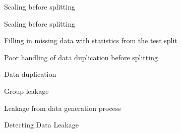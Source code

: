 \begin{frame}{Scaling before splitting}
  \begin{tdcodet}{Scaling before splitting}
  \end{tdcodet}
\end{frame}

\begin{frame}{Filling in missing data with statistics from the test split}
  \begin{withmargin}
    \begin{tdmain}
    \end{tdmain}
    \begin{tdmargin}
    \end{tdmargin}
  \end{withmargin}
\end{frame}

\begin{frame}{Poor handling of data duplication before splitting}
  \begin{tddef}{Data duplication}
  \end{tddef}
\end{frame}

\begin{frame}{Group leakage}
  \begin{withmargin}
    \begin{tdmain}
    \end{tdmain}
    \begin{tdmargin}
    \end{tdmargin}
  \end{withmargin}
\end{frame}

\begin{frame}{Leakage from data generation process}
  \begin{sidebody}
  \end{sidebody}
\end{frame}

\begin{frame}{Detecting Data Leakage}
  \begin{withmargin}
    \begin{tdmain}
    \end{tdmain}
    \begin{tdmargin}
    \end{tdmargin}
  \end{withmargin}
\end{frame}

